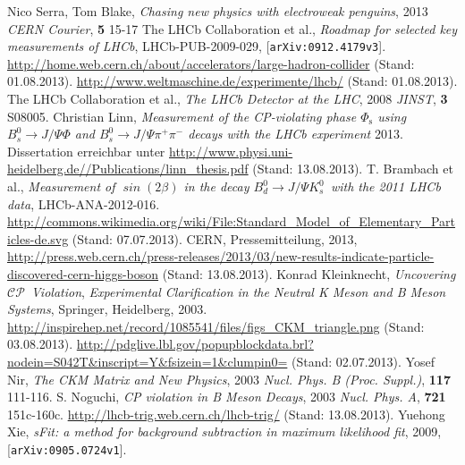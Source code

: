 \documentclass[ a4paper,
                12pt, 
                twoside, 
                chapterprefix,                
              ]{scrreprt}
\newcommand{\CP}{$\mathcal{CP}$}
\newcommand{\Decaychannel}{$B_d^0 \rightarrow J/\Psi K_s^0$}
\begin{document}

\tableofcontents









\begin{thebibliography}{---}
 Nico Serra, Tom Blake, \textit{Chasing new physics with electroweak penguins}, 2013 \textit{CERN Courier}, \textbf{5} 15-17 
 The LHCb Collaboration et al., \textit{Roadmap for selected key measurements of LHCb}, LHCb-PUB-2009-029, [\texttt{arXiv:0912.4179v3}]. 
 \url{http://home.web.cern.ch/about/accelerators/large-hadron-collider} (Stand: 01.08.2013).
 \url{http://www.weltmaschine.de/experimente/lhcb/} (Stand: 01.08.2013).
 The LHCb Collaboration et al., \textit{The LHCb Detector at the LHC}, 2008 \textit{JINST}, \textbf{3} S08005.
 Christian Linn, \textit{Measurement of the CP-violating phase $\Phi_{\text{s}}$ using $B_s^0 \rightarrow J/\Psi\Phi$ and $B_s^0 \rightarrow J/\Psi\pi^+\pi^-$ decays with the LHCb experiment} 2013. Dissertation erreichbar unter \url{http://www.physi.uni-heidelberg.de//Publications/linn_thesis.pdf} (Stand: 13.08.2013).
 T. Brambach et al., \textit{Measurement of $\mathit{\sin(2\beta)}$ in the decay \Decaychannel\ with the 2011 LHCb data}, LHCb-ANA-2012-016.
 \url{http://commons.wikimedia.org/wiki/File:Standard_Model_of_Elementary_Particles-de.svg} (Stand: 07.07.2013).
 CERN, Pressemitteilung, 2013, \url{http://press.web.cern.ch/press-releases/2013/03/new-results-indicate-particle-discovered-cern-higgs-boson} (Stand: 13.08.2013).
  Konrad Kleinknecht, \textit{Uncovering \CP\ Violation}, \textit{Experimental Clarification in the Neutral K Meson and B Meson Systems}, Springer, Heidelberg, 2003.
 \url{http://inspirehep.net/record/1085541/files/figs_CKM_triangle.png} (Stand: 03.08.2013).
 \url{http://pdglive.lbl.gov/popupblockdata.brl?nodein=S042T&inscript=Y&fsizein=1&clumpin0=} (Stand: 02.07.2013).
 Yosef Nir, \textit{The CKM Matrix and New Physics}, 2003 \textit{Nucl. Phys. B (Proc. Suppl.)}, \textbf{117} 111-116.
 S. Noguchi, \textit{CP violation in B Meson Decays}, 2003 \textit{Nucl. Phys. A}, \textbf{721} 151c-160c.
 \url{http://lhcb-trig.web.cern.ch/lhcb-trig/} (Stand: 13.08.2013).
 Yuehong Xie, \textit{sFit: a method for background subtraction in maximum likelihood fit}, 2009, [\texttt{arXiv:0905.0724v1}].

\end{thebibliography}
\end{document}
